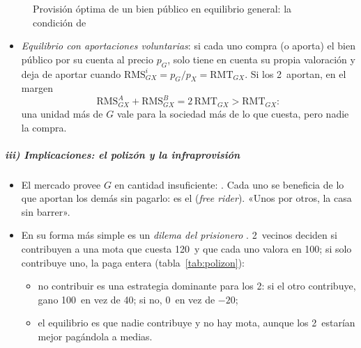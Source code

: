 \documentclass[11pt]{article}
\begin{document}
\begin{figure}[H]
\centering
\caption{Provisión óptima de un bien público en equilibrio general: la condición de }\label{fig:samuelson-eg}
\end{figure}

\begin{itemize}
\item \emph{Equilibrio con aportaciones voluntarias}: si cada uno compra (o aporta) el bien público por su cuenta al precio $p_G$, solo tiene en cuenta su propia valoración y deja de aportar cuando $\mathrm{RMS}^i_{GX}=p_G/p_X=\mathrm{RMT}_{GX}$. Si los 2~aportan, en el margen
  \begin{equation}\label{eq:samuelson-mercado}
  \mathrm{RMS}^A_{GX}+\mathrm{RMS}^B_{GX}=2\,\mathrm{RMT}_{GX}>\mathrm{RMT}_{GX}:
  \end{equation}
  una unidad más de $G$ vale para la sociedad más de lo que cuesta, pero nadie la compra.
\end{itemize}

\subparagraph{iii) Implicaciones: el polizón y la infraprovisión}
\begin{itemize}
\item El mercado provee $G$ en cantidad insuficiente: . Cada uno se beneficia de lo que aportan los demás sin pagarlo: es el  (\emph{free rider}). «Unos por otros, la casa sin barrer».
\item En su forma más simple es un \emph{dilema del prisionero} . 2~vecinos deciden si contribuyen a una mota que cuesta 120~y que cada uno valora en 100; si solo contribuye uno, la paga entera (tabla~\ref{tab:polizon}):
  \begin{itemize}
  \item no contribuir es una estrategia dominante para los 2: si el otro contribuye, gano 100~en vez de 40; si no, 0~en vez de $-20$;
  \item el equilibrio es que nadie contribuye y no hay mota, aunque los 2~estarían mejor pagándola a medias.
  \end{itemize}
\end{itemize}
\end{document}
